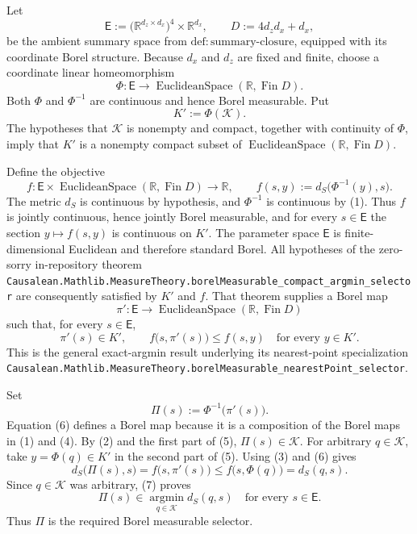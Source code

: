 Let
\[
\mathsf E:=\bigl(\mathbb R^{d_z\times d_x}\bigr)^4\times\mathbb R^{d_x},
\qquad D:=4d_zd_x+d_x,
\]
be the ambient summary space from \(\mathrm{def:summary\text{-}closure}\), equipped with its coordinate Borel structure.  Because \(d_x\) and \(d_z\) are fixed and finite, choose a coordinate linear homeomorphism
\[
\Phi:\mathsf E\longrightarrow \operatorname{EuclideanSpace}(\mathbb R,\operatorname{Fin}D).
\tag{1}
\]
Both \(\Phi\) and \(\Phi^{-1}\) are continuous and hence Borel measurable.  Put
\[
K':=\Phi(\mathcal K).
\tag{2}
\]
The hypotheses that \(\mathcal K\) is nonempty and compact, together with continuity of \(\Phi\), imply that \(K'\) is a nonempty compact subset of \(\operatorname{EuclideanSpace}(\mathbb R,\operatorname{Fin}D)\).

Define the objective
\[
f:\mathsf E\times\operatorname{EuclideanSpace}(\mathbb R,\operatorname{Fin}D)
\longrightarrow\mathbb R,
\qquad
f(s,y):=d_S\bigl(\Phi^{-1}(y),s\bigr).
\tag{3}
\]
The metric \(d_S\) is continuous by hypothesis, and \(\Phi^{-1}\) is continuous by (1).  Thus \(f\) is jointly continuous, hence jointly Borel measurable, and for every \(s\in\mathsf E\) the section \(y\mapsto f(s,y)\) is continuous on \(K'\).  The parameter space \(\mathsf E\) is finite-dimensional Euclidean and therefore standard Borel.  All hypotheses of the zero-sorry in-repository theorem
\texttt{Causalean.Mathlib.MeasureTheory.borelMeasurable\_compact\_argmin\_selector}
are consequently satisfied by \(K'\) and \(f\).  That theorem supplies a Borel map
\[
\pi':\mathsf E\longrightarrow\operatorname{EuclideanSpace}(\mathbb R,\operatorname{Fin}D)
\tag{4}
\]
such that, for every \(s\in\mathsf E\),
\[
\pi'(s)\in K',
\qquad
f\bigl(s,\pi'(s)\bigr)\le f(s,y)
\quad\text{for every }y\in K'.
\tag{5}
\]
This is the general exact-argmin result underlying its nearest-point specialization
\texttt{Causalean.Mathlib.MeasureTheory.borelMeasurable\_nearestPoint\_selector}.

Set
\[
\Pi(s):=\Phi^{-1}\bigl(\pi'(s)\bigr).
\tag{6}
\]
Equation (6) defines a Borel map because it is a composition of the Borel maps in (1) and (4).  By (2) and the first part of (5), \(\Pi(s)\in\mathcal K\).  For arbitrary \(q\in\mathcal K\), take \(y=\Phi(q)\in K'\) in the second part of (5).  Using (3) and (6) gives
\[
d_S\bigl(\Pi(s),s\bigr)
=f\bigl(s,\pi'(s)\bigr)
\le f\bigl(s,\Phi(q)\bigr)
=d_S(q,s).
\tag{7}
\]
Since \(q\in\mathcal K\) was arbitrary, (7) proves
\[
\Pi(s)\in\operatorname*{argmin}_{q\in\mathcal K}d_S(q,s)
\quad\text{for every }s\in\mathsf E.
\]
Thus \(\Pi\) is the required Borel measurable selector.
